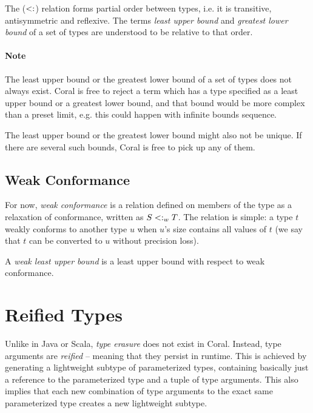 The ($<:$) relation forms partial order between types, i.e. it is transitive, antisymmetric and reflexive. The terms {\em least upper bound} and {\em greatest lower bound} of a set of types are understood to be relative to that order. 

\paragraph{Note}
The least upper bound or the greatest lower bound of a set of types does not always exist. Coral is free to reject a term which has a type specified as a least upper bound or a greatest lower bound, and that bound would be more complex than a preset limit, e.g. this could happen with infinite bounds sequence. 

The least upper bound or the greatest lower bound might also not be unique. If there are several such bounds, Coral is free to pick up any of them. 





\subsection{Weak Conformance}
\label{sec:weak-conformance}

For now, {\em weak conformance} is a relation defined on members of the  type as a relaxation of conformance, written as $S <: _w T$. The relation is simple: a type $t$ weakly conforms to another type $u$ when $u$'s size contains all values of $t$ (we say that $t$ can be converted to $u$ without precision loss). 

A {\em weak least upper bound} is a least upper bound with respect to weak conformance. 





\section{Reified Types}
\label{sec:reified-types}

Unlike in Java or Scala, {\em type erasure} does not exist in Coral. Instead, type arguments are {\em reified} -- meaning that they persist in runtime. This is achieved by generating a lightweight subtype of parameterized types, containing basically just a reference to the parameterized type and a tuple of type arguments. This also implies that each new combination of type arguments to the exact same parameterized type creates a new lightweight subtype.

